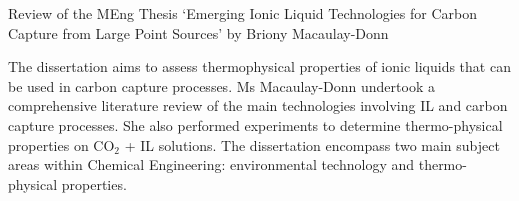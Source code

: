 \documentclass[14pt,twoside]{report}
\begin{document}
\vfill
\clearpage


\bigskip

\begin{center}
  {\Large Review of the MEng Thesis `Emerging Ionic Liquid Technologies for Carbon Capture from Large Point Sources' by Briony Macaulay-Donn}
\end{center}
The dissertation aims to assess thermophysical properties of ionic liquids that can be used in carbon capture processes.  Ms Macaulay-Donn undertook a comprehensive literature review of the main technologies involving IL and carbon capture processes. She also performed experiments to determine thermo-physical properties on CO$_{2}$ + IL solutions. The dissertation encompass two main subject areas within Chemical Engineering: environmental technology and thermo-physical properties.
\end{document}
